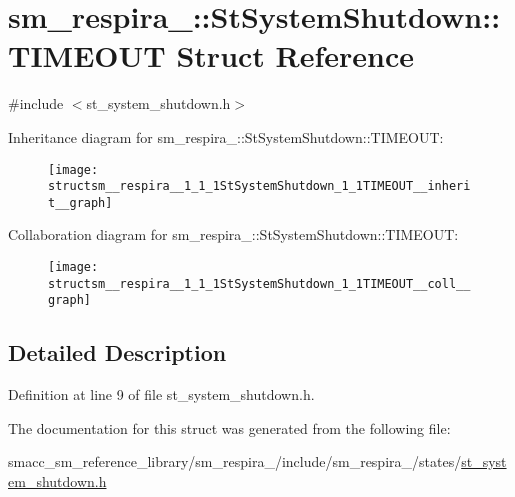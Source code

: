 \hypertarget{structsm__respira__1_1_1StSystemShutdown_1_1TIMEOUT}{}\section{sm\+\_\+respira\+\_\+:\+:St\+System\+Shutdown\+:\+:T\+I\+M\+E\+O\+UT Struct Reference}
\label{structsm__respira__1_1_1StSystemShutdown_1_1TIMEOUT}


{\ttfamily \#include $<$st\+\_\+system\+\_\+shutdown.\+h$>$}



Inheritance diagram for sm\+\_\+respira\+\_\+:\+:St\+System\+Shutdown\+:\+:T\+I\+M\+E\+O\+UT\+:
\nopagebreak
\begin{figure}[H]
\begin{center}
\leavevmode
\texttt{[image: structsm\_\_respira\_\_1\_1\_1StSystemShutdown\_1\_1TIMEOUT\_\_inherit\_\_graph]}
\end{center}
\end{figure}


Collaboration diagram for sm\+\_\+respira\+\_\+:\+:St\+System\+Shutdown\+:\+:T\+I\+M\+E\+O\+UT\+:
\nopagebreak
\begin{figure}[H]
\begin{center}
\leavevmode
\texttt{[image: structsm\_\_respira\_\_1\_1\_1StSystemShutdown\_1\_1TIMEOUT\_\_coll\_\_graph]}
\end{center}
\end{figure}


\subsection{Detailed Description}


Definition at line 9 of file st\+\_\+system\+\_\+shutdown.\+h.



The documentation for this struct was generated from the following file\+:\begin{DoxyCompactItemize}
\item 
smacc\+\_\+sm\+\_\+reference\+\_\+library/sm\+\_\+respira\+\_/include/sm\+\_\+respira\+\_/states/\hyperlink{st__system__shutdown_8h}{st\+\_\+system\+\_\+shutdown.\+h}\end{DoxyCompactItemize}
